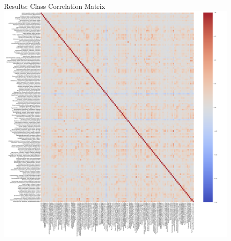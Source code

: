 \begin{frame}{Results: Class Correlation Matrix}
    \centering
    \includegraphics[height=0.9\textheight,width=0.9\textwidth,keepaspectratio]{images/no_filter.png}
\end{frame}

